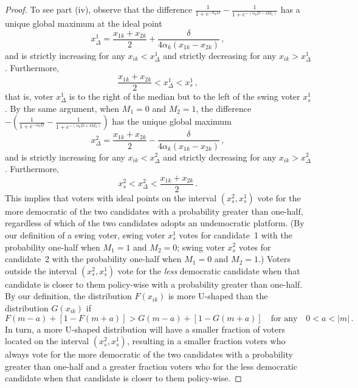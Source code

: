 \documentclass[12pt]{article}
\begin{document}
\begin{proof}
To see part (iv), observe that the difference $\frac{1}{1+e^{-\alpha_k D}}-\frac{1}{1+e^{-(\alpha_k D - \delta M_1)}}$ has a unique global maximum at the ideal point
\begin{equation*}
x^1_{\Delta} = \frac{x_{1k} + x_{2k}}{2} + \frac{\delta}{4 \alpha_k (x_{1k} - x_{2k})} \, ,
\end{equation*}
and is strictly increasing for any $x_{ik}<x^1_{\Delta}$ and strictly decreasing for any $x_{ik}>x^1_{\Delta}$. Furthermore,
\begin{equation*}
\frac{x_{1k} + x_{2k}}{2} < x^1_{\Delta} < x_{s}^1 \, ,
\end{equation*}
that is, voter $x^1_{\Delta}$ is to the right of the median but to the left of the swing voter $x_{s}^1$. By the same argument, when $M_1=0$ and $M_2=1$, the difference $-(\frac{1}{1+e^{-\alpha_k D}}-\frac{1}{1+e^{-(\alpha_k D + \delta M_2)}})$ has the unique global maximum
\begin{equation*}
x^2_{\Delta} = \frac{x_{1k} + x_{2k}}{2} - \frac{\delta}{4 \alpha_k (x_{1k} - x_{2k})} \, ,
\end{equation*}
and is strictly increasing for any $x_{ik}<x^2_{\Delta}$ and strictly decreasing for any $x_{ik}>x^2_{\Delta}$. Furthermore,
\begin{equation*}
x_{s}^2 < x^2_{\Delta} < \frac{x_{1k} + x_{2k}}{2} \, .
\end{equation*}
This implies that voters with ideal points on the interval $(x_{s}^2, x_{s}^1)$ vote for the more democratic of the two candidates with a probability greater than one-half, regardless of which of the two candidates adopts an undemocratic platform. (By our definition of a swing voter, swing voter $x_{s}^1$ votes for candidate~1 with the probability one-half when $M_1=1$ and $M_2=0$; swing voter $x_{s}^2$ votes for candidate~2 with the probability one-half when $M_1=0$ and $M_2=1$.) Voters outside the interval $(x_{s}^2, x_{s}^1)$ vote for the \emph{less} democratic candidate when that candidate is closer to them policy-wise with a probability greater than one-half. 
By our definition, the distribution $F(x_{ik})$ is more U-shaped than the distribution $G(x_{ik})$ if
\begin{equation*}
F(m-a) + [1-F(m+a)] > G(m-a) + [1-G(m+a)] \quad \text{for any} \quad 0<a<|m| \, .
\end{equation*}
In turn, a more U-shaped distribution will have a smaller fraction of voters located on the interval $(x_{s}^2, x_{s}^1)$, resulting in a smaller fraction voters who always vote for the more democratic of the two candidates with a probability greater than one-half and a greater fraction voters who for the less democratic candidate when that candidate is closer to them policy-wise.
\end{proof}
\end{document}
